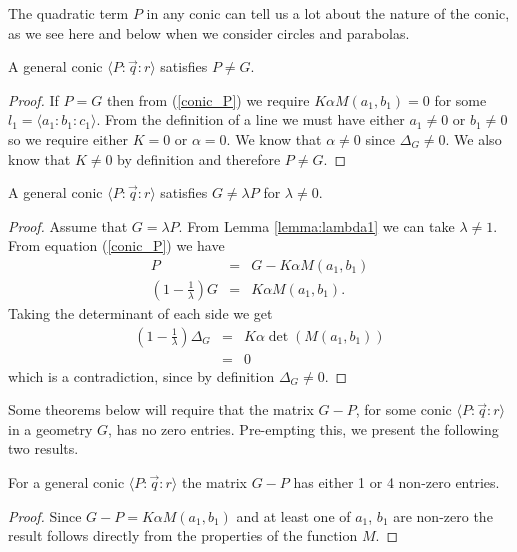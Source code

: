 The quadratic term $P$ in any conic can tell us a lot about the nature of the conic, as we see here and below when we consider circles and parabolas.

\begin{lemma}\label{lemma:lambda1}
A general conic $\langle P\!:\!\vec{q}\!:\!r \rangle$ satisfies $P \neq G$.
\end{lemma}
\begin{proof}
If $P = G$ then from (\ref{conic_P}) we require $K\alpha M(a_1, b_1) = 0$ for some $l_1 = \langle a_1\!:\!b_1\!:\!c_1 \rangle$.
From the definition of a line we must have either $a_1 \neq 0$ or $b_1 \neq 0$ so we require either $K = 0$ or $\alpha = 0$.
We know that $\alpha \neq 0$ since $\Delta_G \neq 0$. 
We also know that $K \neq 0$ by definition and therefore $P \neq G$.
\end{proof}

\begin{lemma}
A general conic $\langle P\!:\!\vec{q}\!:\!r \rangle$ satisfies $G \neq \lambda P$ for $\lambda \neq 0$.
\end{lemma}
\begin{proof}
Assume that $G = \lambda P$. From Lemma \ref{lemma:lambda1} we can take $\lambda \neq 1$. From equation (\ref{conic_P}) we have
\begin{eqnarray}
P & = & G - K\alpha M(a_1, b_1)\nonumber\\
\left(1 - \frac{1}{\lambda} \right)G & = & K\alpha M(a_1, b_1).\nonumber
\end{eqnarray}
Taking the determinant of each side we get
\begin{eqnarray*}
\left(1 - \frac{1}{\lambda} \right)\Delta_G & = & K\alpha \det(M(a_1, b_1))\\
 & = & 0
\end{eqnarray*}
which is a contradiction, since by definition $\Delta_G \neq 0$.
\end{proof}

Some theorems below will require that the matrix $G - P$, for some conic $\langle P\!:\!\vec{q}\!:\!r \rangle$ in a geometry $G$, has no zero entries.
Pre-empting this, we present the following two results.

\begin{lemma}
For a general conic $\langle P\!:\!\vec{q}\!:\!r \rangle$ the matrix $G - P$ has either 1 or 4 non-zero entries.
\end{lemma}
\begin{proof}
Since $G - P = K\alpha M(a_1, b_1)$ and at least one of $a_1$, $b_1$ are non-zero the result follows directly from the properties of the function $M$.
\end{proof}

